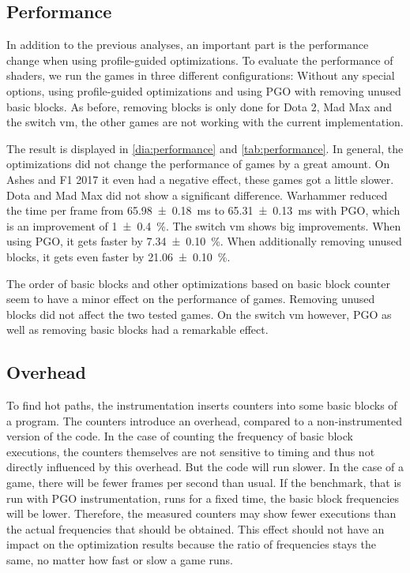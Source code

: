 \subsection{Performance}
\label{sub:eval_perf}
In addition to the previous analyses, an important part is the performance change when using profile-guided optimizations.
To evaluate the performance of shaders, we run the games in three different configurations: Without any special options, using profile-guided optimizations and using PGO with removing unused basic blocks.
As before, removing blocks is only done for Dota 2, Mad Max and the switch vm, the other games are not working with the current implementation.


\begin{table}
	\centering
	\label{tab:performance}
\end{table}

The result is displayed in \cref{dia:performance} and \cref{tab:performance}.
In general, the optimizations did not change the performance of games by a great amount.
On Ashes and F1 2017 it even had a negative effect, these games got a little slower.
Dota and Mad Max did not show a significant difference.
Warhammer reduced the time per frame from \SI{65.98 \pm 0.18}{\milli\second} to \SI{65.31 \pm 0.13}{\milli\second} with PGO, which is an improvement of \SI{1 \pm 0.4}{\percent}.
The switch vm shows big improvements. When using PGO, it gets faster by \SI{7.34 \pm 0.10}{\percent}.
When additionally removing unused blocks, it gets even faster by \SI{21.06 \pm 0.10}{\percent}.

The order of basic blocks and other optimizations based on basic block counter seem to have a minor effect on the performance of games.
Removing unused blocks did not affect the two tested games.
On the switch vm however, PGO as well as removing basic blocks had a remarkable effect.

\subsection{Overhead}
\label{sub:overhead}
To find hot paths, the instrumentation inserts counters into some basic blocks of a program. The counters introduce an overhead, compared to a non-instrumented version of the code.
In the case of counting the frequency of basic block executions, the counters themselves are not sensitive to timing and thus not directly influenced by this overhead.
But the code will run slower. In the case of a game, there will be fewer frames per second than usual.
If the benchmark, that is run with PGO instrumentation, runs for a fixed time, the basic block frequencies will be lower.
Therefore, the measured counters may show fewer executions than the actual frequencies that should be obtained.
This effect should not have an impact on the optimization results because the ratio of frequencies stays the same, no matter how fast or slow a game runs.

